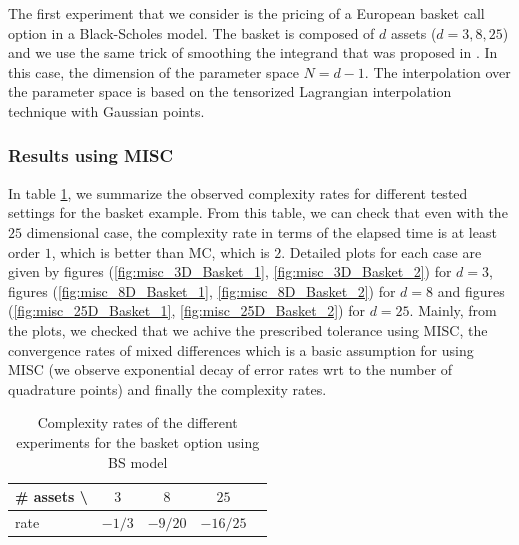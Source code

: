 \documentclass[11pt]{article}
\begin{document}
The first experiment that we consider is the pricing of  a European  basket call option in a Black-Scholes model. The basket is composed of $d$ assets ($d=3,8,25$) and we use the same trick of smoothing the integrand that was proposed in \cite{bayersmoothing}. In this case, the dimension of the parameter space $N=d-1$. The interpolation over the parameter space is based on the tensorized Lagrangian interpolation technique with Gaussian  points.


\subsubsection{Results using MISC}
In table \ref{table: Complexity rates of the different experiemnts  for the basket option using BS model}, we summarize the observed  complexity rates for different tested settings for the basket example. From this table, we can check that even with the $25$ dimensional case, the complexity rate in terms of the elapsed time is at least order $1$, which is better than MC, which is $2$. Detailed plots for each case are given by figures (\ref{fig:misc_3D_Basket_1}, \ref{fig:misc_3D_Basket_2}) for $d=3$, figures (\ref{fig:misc_8D_Basket_1}, \ref{fig:misc_8D_Basket_2}) for $d=8$ and figures (\ref{fig:misc_25D_Basket_1}, \ref{fig:misc_25D_Basket_2}) for $d=25$. Mainly, from the plots, 
we checked  that we achive the prescribed tolerance using MISC, the convergence rates of mixed differences which is a basic assumption for using MISC (we observe exponential decay of error rates wrt to the number of quadrature points) and finally the complexity rates.


\begin{table}[h!]
	\centering
	\begin{tabular}{l*{3}{c}r}
		\# assets  \textbackslash          & $3$ & $8$ & $25$   \\
		\hline
		rate   & $-1/3$ & $-9/20$ & $-16/25$  \\
		\hline
	\end{tabular}
	\caption{Complexity rates of the different experiments  for the basket option using BS model}
	\label{table: Complexity rates of the different experiemnts  for the basket option using BS model}
\end{table}	
\end{document}
